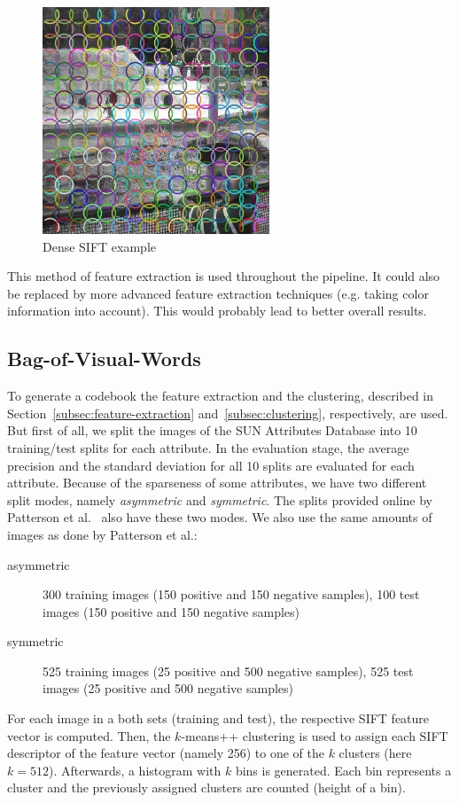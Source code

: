 \documentclass{vldb}
\begin{document}
\begin{figure}
  \centering
  \includegraphics[width = .25\textwidth]{figs/dense_sift.jpg}
  \caption{Dense SIFT example}
  \label{fig:dense-sift-example}
\end{figure}

This method of feature extraction is used throughout the pipeline. It could also
be replaced by more advanced feature extraction techniques (e.g. taking color
information into account). This would probably lead to better overall results.

\subsection{Bag-of-Visual-Words}
\label{subsec:bovw}

To generate a codebook the feature extraction and the clustering, described in
Section~\ref{subsec:feature-extraction} and~\ref{subsec:clustering}, respectively,
are used.
But first of all, we split the images of the SUN Attributes Database into 10
training/test splits for each attribute. In the evaluation stage, the average
precision and the standard deviation for all 10 splits are evaluated for each
attribute. Because of the sparseness of some attributes, we have two different
split modes, namely \emph{asymmetric} and \emph{symmetric}. The splits provided
online by Patterson et al.~\cite{Patterson:2012} also have these two modes.
We also use the same amounts of images as done by Patterson et al.:
\begin{description}
  \item[asymmetric] 300 training images (150 positive and 150 negative samples),
    100 test images (150 positive and 150 negative samples)
  \item[symmetric] 525 training images (25 positive and 500 negative samples),
    525 test images (25 positive and 500 negative samples)
\end{description}

For each image in a both sets (training and test), the respective SIFT feature
vector is computed. Then, the $k$-means++ clustering is used to assign each SIFT
descriptor of the feature vector (namely 256) to one of the $k$ clusters (here
$k=512$). Afterwards, a histogram with $k$ bins is generated. Each bin represents
a cluster and the previously assigned clusters are counted (height of a bin).
\end{document}
